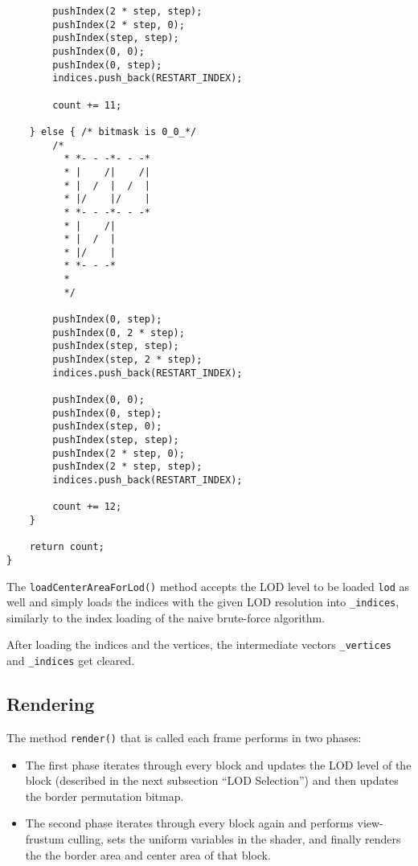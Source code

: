 \begin{lstlisting}
        pushIndex(2 * step, step);
        pushIndex(2 * step, 0);
        pushIndex(step, step);
        pushIndex(0, 0);
        pushIndex(0, step);
        indices.push_back(RESTART_INDEX);

        count += 11;

    } else { /* bitmask is 0_0_*/
        /*
          * *- - -*- - -*
          * |    /|    /|
          * |  /  |  /  |
          * |/    |/    |
          * *- - -*- - -*
          * |    /|
          * |  /  |
          * |/    |
          * *- - -*
          *
          */

        pushIndex(0, step);
        pushIndex(0, 2 * step);
        pushIndex(step, step);
        pushIndex(step, 2 * step);
        indices.push_back(RESTART_INDEX);

        pushIndex(0, 0);
        pushIndex(0, step);
        pushIndex(step, 0);
        pushIndex(step, step);
        pushIndex(2 * step, 0);
        pushIndex(2 * step, step);
        indices.push_back(RESTART_INDEX);

        count += 12;
    }

    return count;
}
\end{lstlisting}

The \texttt{loadCenterAreaForLod()} method accepts the LOD level to be loaded \texttt{lod} as well and 
simply loads the indices with the given LOD resolution into \texttt{\_indices}, similarly to 
the index loading of the naive brute-force algorithm. 

After loading the indices and the vertices, 
the intermediate vectors \texttt{\_vertices} and \texttt{\_indices} get cleared.

\subsection{Rendering}
The method \texttt{render()} that is called each frame performs in two phases:
\begin{itemize}
  \item The first phase iterates through every block and updates the LOD level of the block (described in the next subsection ``LOD Selection'')
        and then updates the border permutation bitmap.
  \item The second phase iterates through every block again and performs view-frustum culling, sets the uniform variables in the shader,
        and finally renders the the border area and center area of that block.
\end{itemize}


